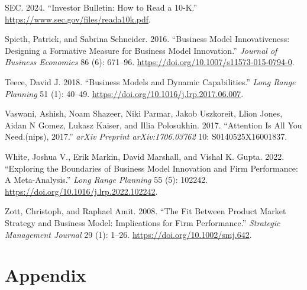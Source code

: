 \documentclass[
]{article}
\newlength{\cslhangindent}
\newenvironment{CSLReferences}[2] %
 {\begin{list}{}{%
  \setlength{\itemindent}{0pt}
  \setlength{\leftmargin}{0pt}
  \setlength{\parsep}{0pt}
  \ifodd #1
   \setlength{\leftmargin}{\cslhangindent}
   \setlength{\itemindent}{-1\cslhangindent}
  \fi
  \setlength{\itemsep}{#2\baselineskip}}}
 {\end{list}}
\begin{document}
\begin{CSLReferences}{1}{0}
SEC. 2024. {``Investor {Bulletin}: {How} to {Read} a 10-{K}.''}
\url{https://www.sec.gov/files/reada10k.pdf}.

Spieth, Patrick, and Sabrina Schneider. 2016. {``Business Model
Innovativeness: Designing a Formative Measure for Business Model
Innovation.''} \emph{Journal of Business Economics} 86 (6): 671--96.
\url{https://doi.org/10.1007/s11573-015-0794-0}.

Teece, David J. 2018. {``Business Models and Dynamic Capabilities.''}
\emph{Long Range Planning} 51 (1): 40--49.
\url{https://doi.org/10.1016/j.lrp.2017.06.007}.

Vaswani, Ashish, Noam Shazeer, Niki Parmar, Jakob Uszkoreit, Llion
Jones, Aidan N Gomez, Lukasz Kaiser, and Illia Polosukhin. 2017.
{``Attention Is All You Need.(nips), 2017.''} \emph{arXiv Preprint
arXiv:1706.03762} 10: S0140525X16001837.

White, Joshua V., Erik Markin, David Marshall, and Vishal K. Gupta.
2022. {``Exploring the Boundaries of Business Model Innovation and Firm
Performance: {A} Meta-Analysis.''} \emph{Long Range Planning} 55 (5):
102242. \url{https://doi.org/10.1016/j.lrp.2022.102242}.

Zott, Christoph, and Raphael Amit. 2008. {``The Fit Between Product
Market Strategy and Business Model: Implications for Firm
Performance.''} \emph{Strategic Management Journal} 29 (1): 1--26.
\url{https://doi.org/10.1002/smj.642}.

\end{CSLReferences}

\newpage{}

\section{Appendix}\label{appendix}
\end{document}
